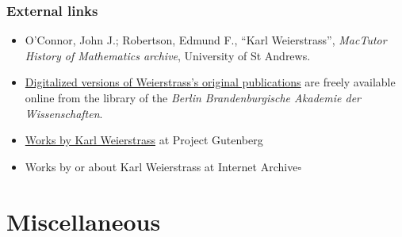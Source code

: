 \documentclass{article}
\begin{document}
\subsubsection{External links}
\begin{itemize}
	\item O'Connor, John J.; Robertson, Edmund F., ``Karl Weierstrass'', \textit{MacTutor History of Mathematics archive}, University of St Andrews.
	\item \href{http://bibliothek.bbaw.de/bibliothek-digital/digitalequellen/schriften/autoren/weierstr/}{Digitalized versions of Weierstrass's original publications} are freely available online from the library of the \textit{Berlin Brandenburgische Akademie der Wissenschaften}.
	\item \href{https://www.gutenberg.org/author/Weierstrass,+Karl}{Works by Karl Weierstrass} at Project Gutenberg
	\item Works by or about Karl Weierstrass at Internet Archive\hfill$\square$
\end{itemize}


\section{Miscellaneous}


\printbibliography[heading=bibintoc]
	
\end{document}
